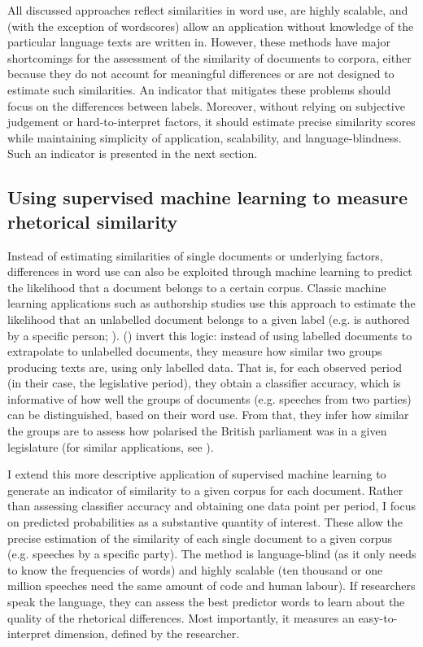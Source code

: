 \documentclass{article}
\begin{document}
All discussed approaches reflect similarities in word use, are highly scalable, and (with the exception of wordscores) allow an application without knowledge of the particular language texts are written in. However, these methods have major shortcomings for the assessment of the similarity of documents to corpora, either because they do not account for meaningful differences or are not designed to estimate such similarities. An indicator that mitigates these problems should focus on the differences between labels. Moreover, without relying on subjective judgement or hard-to-interpret factors, it should estimate precise similarity scores while maintaining simplicity of application, scalability, and language-blindness. Such an indicator is presented in the next section.\par

\subsection{Using supervised machine learning to measure rhetorical similarity}
\label{sec:method}

Instead of estimating similarities of single documents or underlying factors, differences in word use can also be exploited through machine learning to predict the likelihood that a document belongs to a certain corpus. Classic machine learning applications such as authorship studies use this approach to estimate the likelihood that an unlabelled document belongs to a given label (e.g. is authored by a specific person; \cite{Mosteller1963}). \citeauthor{Peterson2018} (\citeyear{Peterson2018}) invert this logic: instead of using labelled documents to extrapolate to unlabelled documents, they measure how similar two groups producing texts are, using only labelled data. That is, for each observed period (in their case, the legislative period), they obtain a classifier accuracy, which is informative of how well the groups of documents (e.g. speeches from two parties) can be distinguished, based on their word use. From that, they infer how similar the groups are to assess how polarised the British parliament was in a given legislature (for similar applications, see \cite{Gentzkow2019, Goet2019}).\par 

I extend this more descriptive application of supervised machine learning to generate an indicator of similarity to a given corpus for each document. Rather than assessing classifier accuracy and obtaining one data point per period, I focus on predicted probabilities as a substantive quantity of interest. These allow the precise estimation of the similarity of each single document to a given corpus (e.g. speeches by a specific party). The method is language-blind (as it only needs to know the frequencies of words) and highly scalable (ten thousand or one million speeches need the same amount of code and human labour). If researchers speak the language, they can assess the best predictor words to learn about the quality of the rhetorical differences. Most importantly, it measures an easy-to-interpret dimension, defined by the researcher. \par
\end{document}
